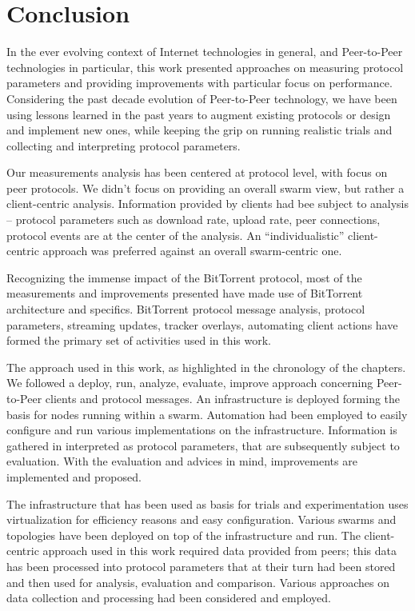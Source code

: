
\chapter{Conclusion}
\label{chapter:conclusion}

In the ever evolving context of Internet technologies in general, and
Peer-to-Peer technologies in particular, this work presented approaches on
measuring protocol parameters and providing improvements with particular focus
on performance. Considering the past decade evolution of Peer-to-Peer
technology, we have been using lessons learned in the past years to augment
existing protocols or design and implement new ones, while keeping the grip on
running realistic trials and collecting and interpreting protocol parameters.

Our measurements analysis has been centered at protocol level, with focus on
peer protocols. We didn't focus on providing an overall swarm view, but rather
a client-centric analysis. Information provided by clients had bee subject to
analysis -- protocol parameters such as download rate, upload rate, peer
connections, protocol events are at the center of the analysis. An
``individualistic'' client-centric approach was preferred against an overall
swarm-centric one.

Recognizing the immense impact of the BitTorrent protocol, most of the
measurements and improvements presented have made use of BitTorrent
architecture and specifics. BitTorrent protocol message analysis, protocol
parameters, streaming updates, tracker overlays, automating client actions
have formed the primary set of activities used in this work.

The approach used in this work, as highlighted in the chronology of the
chapters. We followed a deploy, run, analyze, evaluate, improve approach
concerning Peer-to-Peer clients and protocol messages. An infrastructure is
deployed forming the basis for nodes running within a swarm. Automation had
been employed to easily configure and run various implementations on the
infrastructure. Information is gathered in interpreted as protocol parameters,
that are subsequently subject to evaluation. With the evaluation and advices
in mind, improvements are implemented and proposed.

The infrastructure that has been used as basis for trials and experimentation
uses virtualization for efficiency reasons and easy configuration. Various
swarms and topologies have been deployed on top of the infrastructure and run.
The client-centric approach used in this work required data provided from
peers; this data has been processed into protocol parameters that at their
turn had been stored and then used for analysis, evaluation and comparison.
Various approaches on data collection and processing had been considered and
employed.

